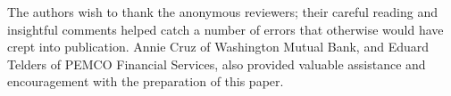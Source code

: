 \documentclass{acmtrans2e}
\begin{document}
\begin{acks}
The authors wish to thank the anonymous reviewers; their careful
reading and insightful comments helped catch a number of errors
that otherwise would have crept into publication.  Annie Cruz of
Washington Mutual Bank, and Eduard Telders of PEMCO Financial
Services, also provided valuable assistance and encouragement with
the preparation of this paper.
\end{acks}

\end{document}
